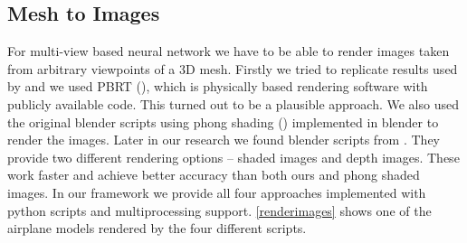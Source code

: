 \subsection{Mesh to Images}
\label{subsec:meshtoimgs}
For multi-view based neural network we have to be able to render images taken from arbitrary viewpoints of a 3D mesh. Firstly we tried to replicate results used by \cite{su_multi-view_2015} and we used PBRT (\cite{pharr_physically_2010}), which is physically based rendering software with publicly available code. This turned out to be a plausible approach. We also used the original blender scripts using phong shading (\cite{bishop_fast_1986}) implemented in blender to render the images.
Later in our research we found blender scripts from \cite{su_deeper_2018}. They provide two different rendering options -- shaded images and depth images. These work faster and achieve better accuracy than both ours and phong shaded images. In our framework we provide all four approaches implemented with python scripts and multiprocessing support. \autoref{renderimages} shows one of the airplane models rendered by the four different scripts.

